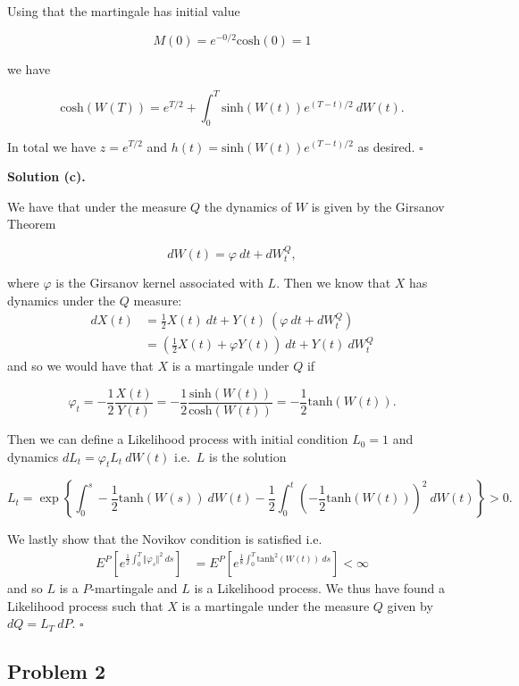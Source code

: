 \documentclass[a4paper,12pt,openany]{book}
\begin{document}
Using that the martingale has initial value

\[
M(0)=e^{-0/2}\text{cosh}(0)=1
\]

we have

\[
\text{cosh}(W(T))=e^{T/2}+\int_0^T \text{sinh}(W(t))e^{(T-t)/2}\ dW(t).
\]

In total we have \(z=e^{T/2}\) and \(h(t)=\text{sinh}(W(t))e^{(T-t)/2}\) as desired. \(\square\)

\noindent\makebox[\linewidth]{\rule{\textwidth}{0.4pt}}

\textbf{Solution (c).}

We have that under the measure \(Q\) the dynamics of \(W\) is given by the Girsanov Theorem

\[
dW(t)=\varphi\ dt+dW^Q_t,
\]

where \(\varphi\) is the Girsanov kernel associated with \(L\). Then we know that \(X\) has dynamics under the \(Q\) measure:
\begin{align*}
dX(t)&=\frac{1}{2}X(t)\ dt+Y(t)\ (\varphi\ dt+dW^Q_t)\\
&=\left(\frac{1}{2}X(t)+\varphi Y(t)\right)\ dt+Y(t)\ dW^Q_t
\end{align*}
and so we would have that \(X\) is a martingale under \(Q\) if

\[
\varphi_t=-\frac{1}{2}\frac{X(t)}{Y(t)}=-\frac{1}{2}\frac{\text{sinh}(W(t))}{\text{cosh}(W(t))}=-\frac{1}{2}\text{tanh}(W(t)).
\]

Then we can define a Likelihood process with initial condition \(L_0=1\) and dynamics \(dL_t=\varphi_tL_t\ dW(t)\) i.e.~\(L\) is the solution

\[
L_t=\exp\left\{\int_0^s-\frac{1}{2}\text{tanh}(W(s)) \ dW(t)-\frac{1}{2}\int_0^t\left(-\frac{1}{2}\text{tanh}(W(t))\right)^2 \ dW(t)\right\}> 0.
\]

We lastly show that the Novikov condition is satisfied i.e.
\begin{align*}
E^P\left[e^{\frac{1}{2}\int_0^T\Vert \varphi_s\Vert^2\ ds}\right]&=E^P\left[e^{\frac{1}{8}\int_0^T\text{tanh}^2(W(t))\ ds}\right]<\infty
\end{align*}
and so \(L\) is a \(P\)-martingale and \(L\) is a Likelihood process. We thus have found a Likelihood process such that \(X\) is a martingale under the measure \(Q\) given by \(dQ=L_T\ dP\). \(\square\)

\noindent\makebox[\linewidth]{\rule{\textwidth}{0.4pt}}

\hypertarget{problem-2-2}{%
\subsection{Problem 2}\label{problem-2-2}}
\end{document}
